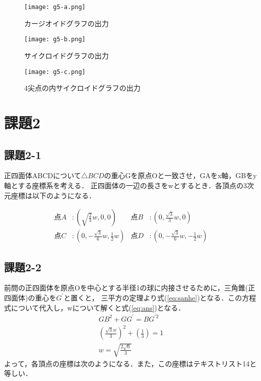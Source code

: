 \documentclass[twocolumn]{jsarticle}%
\begin{document}

\newpage
\begin{figure}[htbp]
 \begin{minipage}{0.49\hsize}
  \begin{center}
   \texttt{[image: g5-a.png]}
  \end{center}
  \caption{カージオイドグラフの出力}
  \label{fig:5-a}
 \end{minipage}
 \begin{minipage}{0.49\hsize}
  \begin{center}
   \texttt{[image: g5-b.png]}
  \end{center}
  \caption{サイクロイドグラフの出力}
  \label{fig:5-b}
 \end{minipage}
\end{figure}
\begin{figure}[htbp]
  \begin{center}
   \texttt{[image: g5-c.png]}
  \end{center}
  \caption{4尖点の内サイクロイドグラフの出力}
  \label{fig:5-c}
\end{figure}

\section{課題2}
\subsection{課題2-1}
正四面体ABCDについて$\triangle{BCD}$の重心Gを原点Oと一致させ，GAをx軸，GBをy軸とする座標系を考える．
正四面体の一辺の長さをwとするとき．各頂点の3次元座標は以下のようになる．

\begin{align*}
点A&:\left(\sqrt{\frac{2}{3}}w, 0, 0\right)&点B&:\left(0, \frac{\sqrt{3}}{3}w, 0\right)\\
点C&:\left(0, -\frac{\sqrt{3}}{6}w, \frac{1}{2}w\right)&点D&:\left(0, -\frac{\sqrt{3}}{6}w, -\frac{1}{2}w\right)
\end{align*}

\subsection{課題2-2}
前問の正四面体を原点Oを中心とする半径1の球に内接させるために，三角錐(正四面体)の重心を$G^\prime$と置くと，
三平方の定理より式(\ref{eq:sanhe})となる．この方程式について代入し，wについて解くと式(\ref{eq:ans})となる．
\begin{eqnarray}
GB^2 + GG^\prime = BG^{{\prime}2}\label{eq:sanhe}\\
\left(\frac{\sqrt{3}w}{3}\right)^2 + \left(\frac{1}{3}\right) = 1\\
w=\sqrt{\frac{2\sqrt{6}}{3}}\label{eq:ans}
\end{eqnarray}
\newpage
よって，各頂点の座標は次のようになる．また，この座標はテキストリスト14と等しい．
\end{document}

